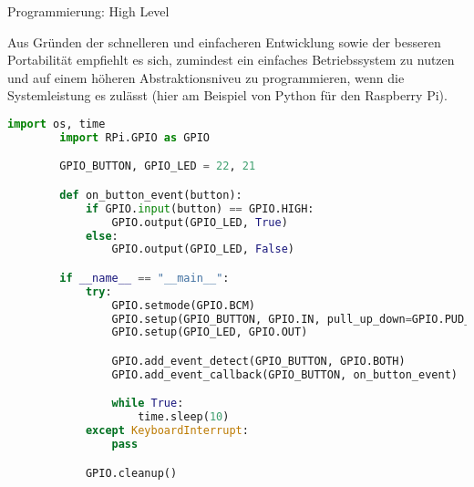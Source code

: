 \begin{frame}[fragile]{Programmierung: High Level}
    \parbox{\linewidth}{
        \footnotesize
        Aus Gründen der schnelleren und einfacheren Entwicklung sowie der besseren
        Portabilität empfiehlt es sich, zumindest ein einfaches Betriebssystem zu
        nutzen und auf einem höheren Abstraktionsniveu zu programmieren, wenn die
        Systemleistung es zulässt (hier am Beispiel von Python für den Raspberry Pi).
    }

    \smallskip

    \begin{lstlisting}[language=Python, gobble=8, basicstyle=\tiny\ttfamily]
        import os, time
        import RPi.GPIO as GPIO

        GPIO_BUTTON, GPIO_LED = 22, 21

        def on_button_event(button):
            if GPIO.input(button) == GPIO.HIGH:
                GPIO.output(GPIO_LED, True)
            else:
                GPIO.output(GPIO_LED, False)

        if __name__ == "__main__":
            try:
                GPIO.setmode(GPIO.BCM)
                GPIO.setup(GPIO_BUTTON, GPIO.IN, pull_up_down=GPIO.PUD_UP)
                GPIO.setup(GPIO_LED, GPIO.OUT)

                GPIO.add_event_detect(GPIO_BUTTON, GPIO.BOTH)
                GPIO.add_event_callback(GPIO_BUTTON, on_button_event)

                while True:
                    time.sleep(10)
            except KeyboardInterrupt:
                pass

            GPIO.cleanup()
    \end{lstlisting}
\end{frame}

